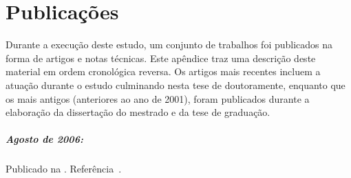 \typeout{ ====================================================================}
\typeout{ ====================================================================}












\chapter{Publicações}
\label{ap:published}

Durante a execução deste estudo, um conjunto de trabalhos foi publicados na
forma de artigos e notas técnicas. Este apêndice traz uma descrição deste
material em ordem cronológica reversa. Os artigos mais recentes incluem a
atuação durante o estudo culminando nesta tese de doutoramente, enquanto que
os mais antigos (anteriores ao ano de 2001), foram publicados durante a
elaboração da dissertação do mestrado e da tese de graduação.

\paragraph{Agosto de 2006: } Publicado na . Referência~\cite{aa:tns-06}.

